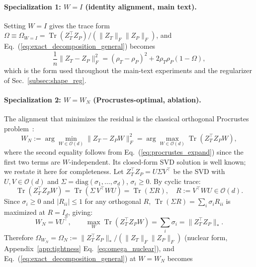 \paragraph{Specialization 1: $W = I$ (identity alignment, main text).}
Setting $W = I$ gives the trace form $\Omega \equiv \Omega_{W=I} = \operatorname{Tr}(Z_T^\top Z_P)/(\|Z_T\|_F \|Z_P\|_F)$, and Eq.~(\ref{eq:exact_decomposition_general}) becomes
\begin{equation}
\frac{1}{n}\|Z_T - Z_P\|_F^2 = (\rho_T - \rho_P)^2 + 2\rho_T\rho_P(1 - \Omega),
\end{equation}
which is the form used throughout the main-text experiments and the regularizer of Sec.~\ref{subsec:shape_reg}.

\paragraph{Specialization 2: $W = W_N$ (Procrustes-optimal, ablation).}
The alignment that minimizes the residual is the classical orthogonal Procrustes problem~\citep{schonemann1966generalized, gower2004procrustes}:
\begin{equation}
W_N := \arg\min_{W \in \mathcal{O}(d)} \|Z_T - Z_P W\|_F^2 = \arg\max_{W \in \mathcal{O}(d)} \operatorname{Tr}(Z_T^\top Z_P W),
\end{equation}
where the second equality follows from Eq.~(\ref{eq:procrustes_expand}) since the first two terms are $W$-independent. Its closed-form SVD solution is well known; we restate it here for completeness. Let $Z_T^\top Z_P = U\Sigma V^\top$ be the SVD with $U, V \in \mathcal{O}(d)$ and $\Sigma = \mathrm{diag}(\sigma_1, \ldots, \sigma_d)$, $\sigma_i \ge 0$. By cyclic trace:
\begin{equation}
\operatorname{Tr}(Z_T^\top Z_P W) = \operatorname{Tr}(\Sigma\, V^\top W U) = \operatorname{Tr}(\Sigma R), \quad R := V^\top W U \in \mathcal{O}(d).
\end{equation}
Since $\sigma_i \ge 0$ and $|R_{ii}| \le 1$ for any orthogonal $R$, $\operatorname{Tr}(\Sigma R) = \sum_i \sigma_i R_{ii}$ is maximized at $R = I_d$, giving:
\begin{equation}
\label{eq:W_optimal}
W_N = V U^\top, \qquad \max_{W} \operatorname{Tr}(Z_T^\top Z_P W) = \sum_i \sigma_i = \|Z_T^\top Z_P\|_*.
\end{equation}
Therefore $\Omega_{W_N} = \Omega_N := \|Z_T^\top Z_P\|_*/(\|Z_T\|_F\|Z_P\|_F)$ (nuclear form, Appendix~\ref{app:tightness} Eq.~\ref{eq:omega_nuclear}), and Eq.~(\ref{eq:exact_decomposition_general}) at $W = W_N$ becomes
